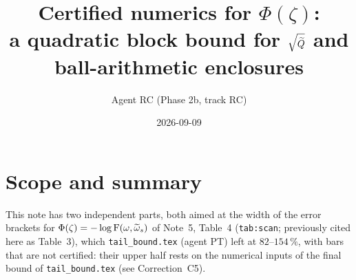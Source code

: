 \documentclass[11pt]{article}
\title{Certified numerics for $\Phi(\zeta)$:\\
a quadratic block bound for $\sqrt{\widetilde{Q}}$ and ball-arithmetic enclosures}
\author{Agent RC (Phase 2b, track RC)}
\date{2026-09-09}
\begin{document}
\maketitle
\tableofcontents

\section{Scope and summary}
\label{sec:scope}
This note has two independent parts, both aimed at the width of the error brackets for
$\Phi(\zeta)=-\log\operatorname{F}(\omega,\widetilde\omega_s)$ of Note~5, Table~4 (\texttt{tab:scan}; previously cited here as Table~3), which
\texttt{tail\_bound.tex} (agent PT) left at $82$--$154\,\%$, with bars that are not certified: their upper half rests on the numerical inputs of the final bound of \texttt{tail\_bound.tex} (see Correction~C5).
\end{document}
